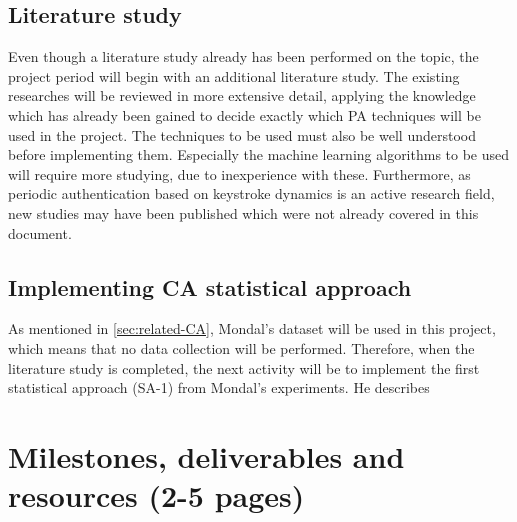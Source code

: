 \documentclass[informationsecurity]{gucmasterproject}
\begin{document}
\section{Literature study}
Even though a literature study already has been performed on the topic, the project period will begin with an additional literature study.
The existing researches will be reviewed in more extensive detail, applying the knowledge which has already been gained to decide exactly which PA techniques will be used in the project.
The techniques to be used must also be well understood before implementing them.
Especially the machine learning algorithms to be used will require more studying, due to inexperience with these.
Furthermore, as periodic authentication based on keystroke dynamics is an active research field, new studies may have been published which were not already covered in this document.


\section{Implementing CA statistical approach}

As mentioned in \cref{sec:related-CA}, Mondal's \cite{mondal} dataset will be used in this project, which means that no data collection will be performed.
Therefore, when the literature study is completed, the next activity will be to implement the first statistical approach (SA-1) from Mondal's experiments.
He describes 




\chapter{Milestones, deliverables and resources (2-5 pages)}
\end{document}
